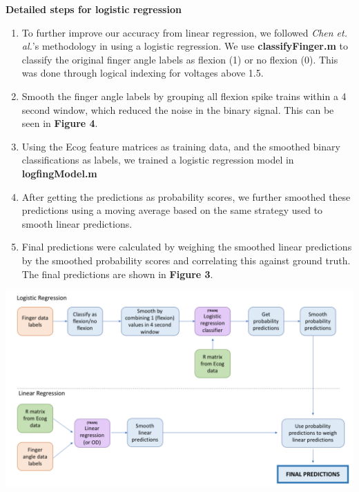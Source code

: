 \documentclass{article}
\begin{document}
    \textbf{Detailed steps for logistic regression}
    \begin{enumerate}
        \item To further improve our accuracy from linear regression, we followed \textit{Chen et. al.}’s methodology in using a logistic regression. We use \textbf{classifyFinger.m} to classify the original finger angle labels as flexion (1) or no flexion (0). This was done through logical indexing for voltages above 1.5. 
        
        \item Smooth the finger angle labels by grouping all flexion spike trains within a 4 second window, which reduced the noise in the binary signal. This can be seen in \textbf{Figure 4}.
        
        \item Using the Ecog feature matrices as training data, and the smoothed binary classifications as labels, we trained a logistic regression model in \textbf{logfingModel.m}
        
        \item After getting the predictions as probability scores, we further smoothed these predictions using a moving average based on the same strategy used to smooth linear predictions.
        
        \item Final predictions were calculated by weighing the smoothed linear predictions by the smoothed probability scores and correlating this against ground truth. The final predictions are shown in \textbf{Figure 3}.\\
    \end{enumerate}
	\begin{minipage}{\linewidth}
        \centering
	    \includegraphics[scale=0.4]{flowchart.png}
	    \label{fig1}
	\end{minipage}\\\\
\end{document}
